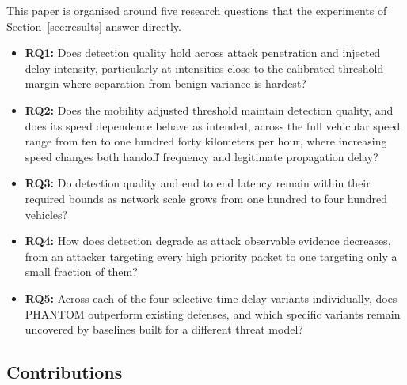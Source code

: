 \documentclass[final,5p,twocolumn]{elsarticle}
\theoremstyle{remark}
\theoremstyle{plain}
\begin{document}
This paper is organised around five research questions that the
experiments of Section~\ref{sec:results} answer directly.
\begin{itemize}
	\item \textbf{RQ1:} Does detection quality hold across attack
	penetration and injected delay intensity, particularly at intensities
	close to the calibrated threshold margin where separation from benign
	variance is hardest?
	\item \textbf{RQ2:} Does the mobility adjusted threshold maintain
	detection quality, and does its speed dependence behave as intended,
	across the full vehicular speed range from ten to one hundred forty
	kilometers per hour, where increasing speed changes both handoff
	frequency and legitimate propagation delay?
	\item \textbf{RQ3:} Do detection quality and end to end latency remain
	within their required bounds as network scale grows from one hundred
	to four hundred vehicles?
	\item \textbf{RQ4:} How does detection degrade as attack observable
	evidence decreases, from an attacker targeting every high priority
	packet to one targeting only a small fraction of them?
	\item \textbf{RQ5:} Across each of the four selective time delay
	variants individually, does PHANTOM outperform existing defenses, and
	which specific variants remain uncovered by baselines built for a
	different threat model?
\end{itemize}

\subsection{Contributions}
\end{document}
